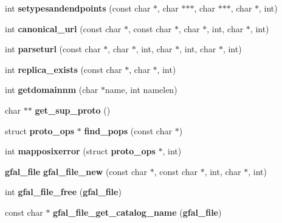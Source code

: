 \begin{DoxyCompactItemize}
\item 
int {\bfseries setypesandendpoints} (const char $\ast$, char $\ast$$\ast$$\ast$, char $\ast$$\ast$$\ast$, char $\ast$, int)\label{group__internal__group_gaab01e39ca4d9384237ae8043d60cefb1}

\item 
int {\bfseries canonical\_\-url} (const char $\ast$, const char $\ast$, char $\ast$, int, char $\ast$, int)\label{group__internal__group_gacbdaeb908eab21b7cbaace2d9e80791e}

\item 
int {\bfseries parseturl} (const char $\ast$, char $\ast$, int, char $\ast$, int, char $\ast$, int)\label{group__internal__group_ga7f02e36e8f02e0579c44be020f4c96e1}

\item 
int {\bfseries replica\_\-exists} (const char $\ast$, char $\ast$, int)\label{group__internal__group_ga8d7f68af19f3d0f86f380292720074eb}

\item 
int {\bfseries getdomainnm} (char $\ast$name, int namelen)\label{group__internal__group_ga3ef6f3cf8c2f9696ad72fcba245da018}

\item 
char $\ast$$\ast$ {\bfseries get\_\-sup\_\-proto} ()\label{group__internal__group_gaa204b2ce73e696d2d90130c4778dfdb4}

\item 
struct {\bf proto\_\-ops} $\ast$ {\bfseries find\_\-pops} (const char $\ast$)\label{group__internal__group_ga1fa5835148dd5e94a73ac08bc65a67c1}

\item 
int {\bfseries mapposixerror} (struct {\bf proto\_\-ops} $\ast$, int)\label{group__internal__group_gaa621b125a055b9d2a82abd3064b6d333}

\item 
{\bf gfal\_\-file} {\bfseries gfal\_\-file\_\-new} (const char $\ast$, const char $\ast$, int, char $\ast$, int)\label{group__internal__group_ga699627cd01838ee314e35e3aee17d924}

\item 
int {\bfseries gfal\_\-file\_\-free} ({\bf gfal\_\-file})\label{group__internal__group_gadb763edc563f02c509ad568a4b2b4979}

\item 
const char $\ast$ {\bfseries gfal\_\-file\_\-get\_\-catalog\_\-name} ({\bf gfal\_\-file})\label{group__internal__group_gac362678d2c03c6c128b9f076600cffbc}


\end{DoxyCompactItemize}

